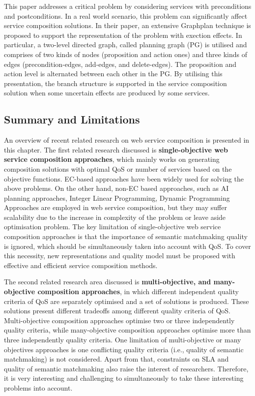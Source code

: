 This paper \cite{wang2016automatic}  addresses a critical problem by considering services with preconditions and postconditions. In a real world scenario, this problem can significantly affect service composition solutions.  In their paper, an extensive Graphplan technique is proposed to support the representation of the problem with exection effects. In particular, a two-level directed graph, called planning graph (PG) is utilised and comprises of two kinds of nodes (proposition and action ones) and three kinds of edges (precondition-edges, add-edges, and delete-edges). The proposition and action level is alternated between each other in the PG.  By utilising this presentation, the branch structure is supported in the service composition solution when some uncertain effects are produced by some services. 

\subsection{Summary and Limitations}\label{summary}

An overview of recent related research on web service composition is presented in this chapter. The first related research discussed is \textbf{single-objective web service composition approaches}, which mainly works on generating composition solutions with optimal QoS or number of services based on the objective functions. EC-based approaches have been widely used for solving the above problems.  On the other hand, non-EC based approaches, such as AI planning approaches, Integer Linear Programming, Dynamic Programming Approaches are employed in web service composition, but they may suffer scalability due to the increase in complexity of the problem or leave aside optimisation problem. The key limitation of single-objective web service composition approaches is that the importance of semantic matchmaking quality is ignored, which should be simultaneously taken into account with QoS. To cover this necessity, new representations and quality model must be proposed with effective and efficient service composition methods.

The second related research area discussed is \textbf{multi-objective, and many-objective composition approaches}, in which different independent quality criteria of QoS are separately optimised and a set of solutions is produced.  These solutions present different tradeoffs among different quality criteria of QoS. Multi-objective composition approaches optimise two or three independently quality criteria, while many-objective composition approaches optimise more than three independently quality criteria. One limitation of multi-objective or many objectives approaches is one conflicting quality criteria (i.e., quality of semantic matchmaking) is not considered. Apart from that,  constraints on SLA and quality of semantic matchmaking also raise the interest of researchers. Therefore, it is very interesting and challenging to simultaneously to take these interesting problems into account.

